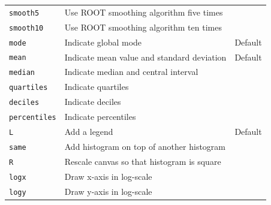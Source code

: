\documentclass[11pt, a4paper]{article}
\begin{document}
\begin{table}[ht!]
\begin{center}
\begin{tabular}{lll}
\verb|smooth5| & Use ROOT smoothing algorithm five times & \\
\verb|smooth10| & Use ROOT smoothing algorithm ten times & \\
\verb|mode| & Indicate global mode & Default \\
\verb|mean| & Indicate mean value and standard deviation & Default \\
\verb|median| & Indicate median and central interval &  \\
\verb|quartiles| & Indicate quartiles & \\
\verb|deciles| & Indicate deciles & \\
\verb|percentiles| & Indicate percentiles & \\
\verb|L| & Add a legend & Default \\
\verb|same| & Add histogram on top of another histogram & \\
\midrule
\verb|R| & Rescale canvas so that histogram is square & \\
\verb|logx| & Draw x-axis in log-scale & \\
\verb|logy| & Draw y-axis in log-scale & \\
\bottomrule
\end{tabular}
\end{center}
\end{table}
\end{document}
